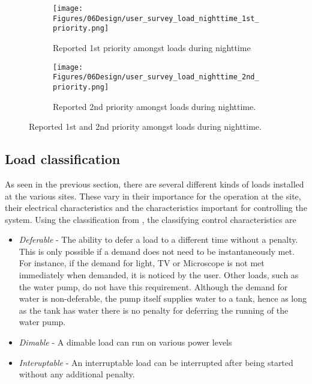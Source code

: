 \begin{figure}[]
  \centering

  \begin{subfigure}{\textwidth}
    \centering
    \texttt{[image: Figures/06Design/user\_survey\_load\_nighttime\_1st\_priority.png]}
    \caption[User survey: Nighttime 1st priority]{Reported 1st priority amongst loads during nighttime}
    \label{fig:user_survey_load_nighttime_1st_priority}
  \end{subfigure}

  \vspace{0.5cm}

  \begin{subfigure}{\textwidth}
    \centering
    \texttt{[image: Figures/06Design/user\_survey\_load\_nighttime\_2nd\_priority.png]}
    \caption[User survey: Nighttime 2nd priority]{Reported 2nd priority amongst loads during nighttime.}
    \label{fig:user_survey_load_nighttime_2nd_priority}
  \end{subfigure}

  \caption[User survey: Nighttime priority]{Reported 1st and 2nd priority amongst loads during nighttime.}
  \label{fig:user_survey_load_nighttime_1st&2nd_priority}
\end{figure}



\subsection{Load classification}\label{seq:load_classification}
As seen in the previous section, there are several different kinds of loads installed at the various sites. These vary in their importance for the operation at the site, their electrical characteristics and the characteristics important for controlling the system. Using the classification from \cite{Philipo2022-rx}, the classifying control characteristics are 
\begin{itemize}
    \item \textit{Deferable} -   The ability to defer a load to a different time without a penalty. This is only possible if a demand does not need to be instantaneously met. For instance, if the demand for light, TV or Microscope is not met immediately when demanded, it is noticed by the user. Other loads, such as the water pump, do not have this requirement. Although the demand for water is non-deferable, the pump itself supplies water to a tank, hence as long as the tank has water there is no penalty for deferring the running of the water pump. 
    \item \textit{Dimable}  -   A dimable load can run on various power levels
    \item \textit{Interuptable} -   An interruptable load can be interrupted after being started without any additional penalty. 
\end{itemize}

